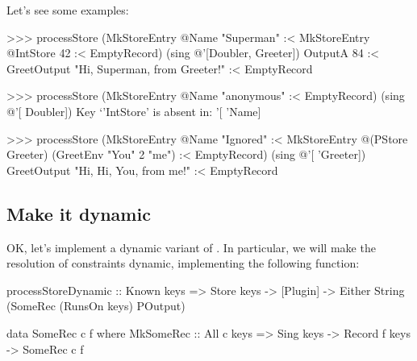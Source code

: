\documentclass[demotion-paper.tex]{subfiles}
\begin{document}
Let's see some examples:
\begin{repl}
>>> processStore 
      (MkStoreEntry @Name "Superman"
        :< MkStoreEntry @IntStore 42
        :< EmptyRecord)
      (sing @'[Doubler, Greeter])
OutputA 84
  :< GreetOutput "Hi, Superman, from Greeter!"
  :< EmptyRecord

>>> processStore 
      (MkStoreEntry @Name "anonymous"
        :< EmptyRecord) 
      (sing @'[ Doubler])
Key `'IntStore' is absent in: '[ 'Name]

>>> processStore 
      (MkStoreEntry @Name "Ignored"
        :< MkStoreEntry @(PStore Greeter) 
            (GreetEnv "You" 2 "me")
        :< EmptyRecord) (sing @'[ 'Greeter])
GreetOutput "Hi, Hi, You, from me!" :< EmptyRecord
\end{repl}

\subsection{Make it dynamic}
OK, let's implement a dynamic variant of .
In particular, we will make the resolution of  constraints dynamic, implementing the following function:

\begin{code}
processStoreDynamic :: Known keys
  => Store keys -> [Plugin]
  -> Either String 
    (SomeRec (RunsOn keys) POutput)

data SomeRec c f where
  MkSomeRec :: All c keys => Sing keys
    -> Record f keys -> SomeRec c f
\end{code}
\end{document}
